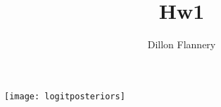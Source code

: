 \documentclass[]{article}
\title{Hw1}
\author{Dillon Flannery	}
\begin{document}
\maketitle



\centering
\texttt{[image: logitposteriors]}

	
	
	
	
	
	
	
	
	
	
\end{document}
